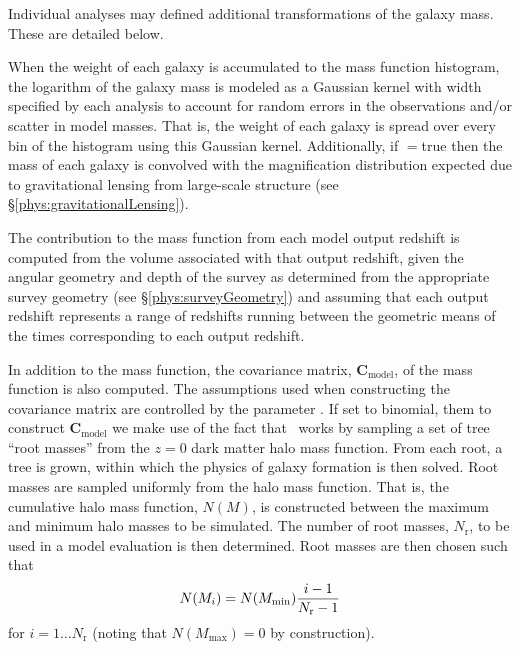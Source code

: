 Individual analyses may defined additional transformations of the galaxy mass. These are detailed below.

When the weight of each galaxy is accumulated to the mass function histogram, the logarithm of the galaxy mass is modeled as a Gaussian kernel with width specified by each analysis to account for random errors in the observations and/or scatter in model masses. That is, the weight of each galaxy is spread over every bin of the histogram using this Gaussian kernel. Additionally, if {\normalfont \ttfamily [analysisMassFunctionsApplyGravitationalLensing]}$=${\normalfont \ttfamily true} then the mass of each galaxy is convolved with the magnification distribution expected due to gravitational lensing from large-scale structure (see \S\ref{phys:gravitationalLensing}).

The contribution to the mass function from each model output redshift is computed from the volume associated with that output redshift, given the angular geometry and depth of the survey as determined from the appropriate survey geometry (see \S\ref{phys:surveyGeometry}) and assuming that each output redshift represents a range of redshifts running between the geometric means of the times corresponding to each output redshift. 

In addition to the mass function, the covariance matrix, $\mathbf{C}_\mathrm{model}$, of the mass function is also computed. The assumptions used when constructing the covariance matrix are controlled by the parameter {\normalfont \ttfamily [analysisMassFunctionCovarianceModel]}. If set to {\normalfont \ttfamily binomial}, them to construct $\mathbf{C}_\mathrm{model}$ we make use of the fact that \glc\ works by sampling a set of tree ``root masses'' from the $z=0$ dark matter halo mass function. From each root, a tree is grown, within which the physics of galaxy formation is then solved. Root masses are sampled uniformly from the halo mass function. That is, the cumulative halo mass function, $N(M)$, is constructed between the maximum and minimum halo masses to be simulated. The number of root masses, $N_\mathrm{r}$, to be used in a model evaluation is then determined. Root masses are then chosen such that
\begin{equation}
 N(M_i) = N(M_\mathrm{min}) {i-1 \over N_\mathrm{r}-1}
\end{equation}
for $i=1\ldots N_\mathrm{r}$ (noting that $N(M_\mathrm{max})=0$ by construction). 

